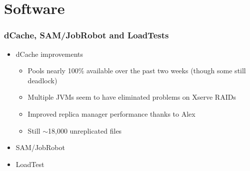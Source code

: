 \documentclass{beamer}
\newcommand{\ca}{\ensuremath{\sim}}
\begin{document}
\section{Software}
\begin{frame}
\frametitle{dCache, SAM/JobRobot and LoadTests}
\begin{itemize}
    \item dCache improvements
    \begin{itemize}
        \item Pools nearly 100\% available over the past two weeks (though some still deadlock)
        \item Multiple JVMs seem to have eliminated problems on Xserve RAIDs\footnotemark{}
        \item Improved replica manager performance thanks to Alex
        \item Still \ca{}18,000 unreplicated files
    \end{itemize}
    \item SAM/JobRobot
    \item LoadTest
\end{itemize}
\end{frame}
\end{document}
